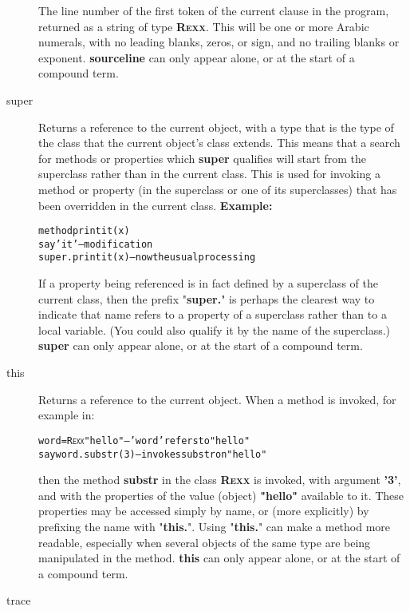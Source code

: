 \begin{description}
The line number of the first token of the current clause in the
\nr{} program, returned as a string of type \textbf{R\textsc{exx}}.
This will be one or more Arabic numerals, with no leading blanks, zeros,
or sign, and no trailing blanks or exponent.
 \textbf{sourceline} can only appear alone, or at the start of a
compound term.
\item[super]\label{refswsuper}
 
Returns a reference to the current object, with a type that is the
type of the class that the current object's class extends.
This means that a search for methods or properties
which \textbf{super} qualifies will start from the superclass rather
than in the current class.
This is used for invoking a method or property (in the superclass or one
of its superclasses) that has been overridden in the current class.
 \textbf{Example:}
\begin{alltt}
method printit(x)
  say 'it'          -- modification
  super.printit(x)  -- now the usual processing
\end{alltt}
 
If a property being referenced is in fact defined by a superclass of
the current class, then the prefix "\textbf{super.}" is perhaps
the clearest way to indicate that name refers to a property of a
superclass rather than to a local variable.
(You could also qualify it by the name of the superclass.)
 \textbf{super} can only appear alone, or at the start of a
compound term.
\item[this]\label{refswthis}
 
Returns a reference to the current object.
When a method is invoked, for example in:
\begin{alltt}
word=R\textsc{exx} "hello"  -- 'word' refers to "hello"
say word.substr(3) -- invokes substr on "hello"
\end{alltt}
then the method \textbf{substr} in the class \textbf{R\textsc{exx}} is
invoked, with argument \textbf{'3'}, and with the properties of the
value (object) \textbf{"hello"} available to it.
These properties may be accessed simply by name, or (more explicitly) by
prefixing the name with "\textbf{this.}".
Using "\textbf{this.}" can make a method more readable,
especially when several objects of the same type are being manipulated
in the method.
 \textbf{this} can only appear alone, or at the start of a
compound term.
\item[trace]\label{refswtrace}


\end{description}
